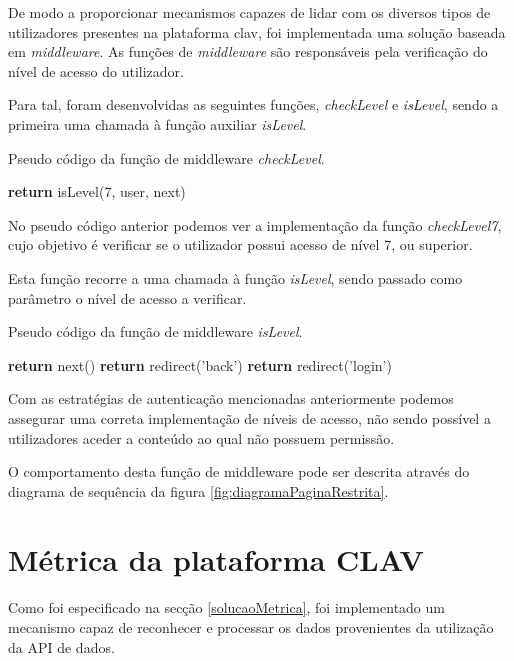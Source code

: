 De modo a proporcionar mecanismos capazes de lidar com os diversos tipos de utilizadores presentes na plataforma \gls{clav}, foi implementada uma solução baseada em \emph{middleware}. As funções de \emph{middleware} são responsáveis pela verificação do nível de acesso do utilizador. 

Para tal, foram desenvolvidas as seguintes funções, \emph{checkLevel} e \emph{isLevel}, sendo a primeira uma chamada à função auxiliar \emph{isLevel}.

\begin{algorithm}
    \caption{Pseudo código da função de middleware \emph{checkLevel}.}
    \begin{algorithmic}[1]
            \State \textbf{return} isLevel(7, user, next)
    \EndFunction
    \end{algorithmic}
\end{algorithm}

No pseudo código anterior podemos ver a implementação da função \emph{checkLevel7}, cujo objetivo é verificar se o utilizador possui acesso de nível 7, ou superior.

Esta função recorre a uma chamada à função \emph{isLevel}, sendo passado como parâmetro o nível de acesso a verificar.

\begin{algorithm}
    \caption{Pseudo código da função de middleware \emph{isLevel}.}
    \begin{algorithmic}[1]
                \State \textbf{return} next()
            \Else
                \State \textbf{return} redirect('back')
            \EndIf
        \Else
            \State \textbf{return} redirect('login')
        \EndIf
    \EndFunction
    \end{algorithmic}
\end{algorithm}

Com as estratégias de autenticação mencionadas anteriormente podemos assegurar uma correta implementação de níveis de acesso, não sendo possível a utilizadores aceder a conteúdo ao qual não possuem permissão.

O comportamento desta função de middleware pode ser descrita através do diagrama de sequência da figura \ref{fig:diagramaPaginaRestrita}.

\cleardoublepage
\section{Métrica da plataforma CLAV}
\vspace{-3mm}
Como foi especificado na secção \ref{solucaoMetrica}, foi implementado um mecanismo capaz de reconhecer e processar os dados provenientes da utilização da API de dados.

